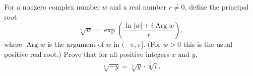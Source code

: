 For a nonzero complex number $w$ and a real number $r\ne0$, define the principal root
\[
\sqrt[r]{w}=\exp\!\left(\dfrac{\ln|w|+i\operatorname{Arg}w}{r}\right),
\]
where $\operatorname{Arg}w$ is the argument of $w$ in $(-\pi,\pi]$. (For $w>0$ this is the usual positive real root.) Prove that for all positive integers $x$ and $y$,
\[
\sqrt[x]{-y}=\sqrt[x]{y}\cdot\sqrt[\dfrac {x}{2}]{i}.
\]
